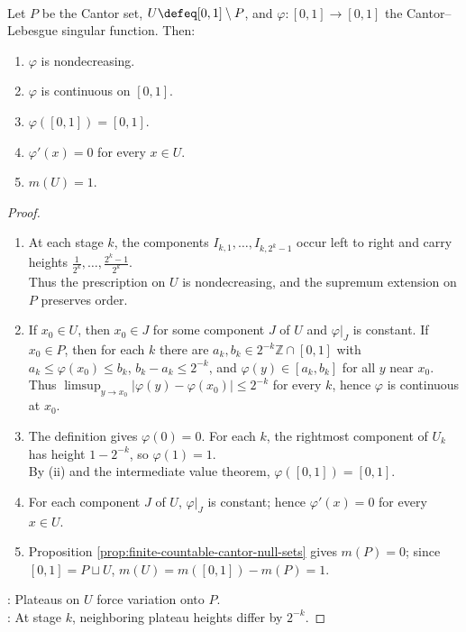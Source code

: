 \begin{proposition} \label{prop:cantor-singular-function-properties} \\
Let $P$ be the Cantor set, $U\defeq[0,1]\setminus P$, and $\varphi:[0,1]\to[0,1]$ the Cantor--Lebesgue singular function. Then:
\begin{enumerate}[label=(\roman*)]
\setlength{\itemsep}{0pt}
\item $\varphi$ is nondecreasing.
\item $\varphi$ is continuous on $[0,1]$.
\item $\varphi([0,1])=[0,1]$.
\item $\varphi'(x)=0$ for every $x\in U$.
\item $m(U)=1$.
\end{enumerate}
\begin{proof}
\begin{enumerate}[label=(\roman*)]
\setlength{\itemsep}{0pt}
\item At each stage $k$, the components $I_{k,1},\ldots,I_{k,2^k-1}$ occur left to right and carry heights $\frac{1}{2^k},\ldots,\frac{2^k-1}{2^k}$.\\
Thus the prescription on $U$ is nondecreasing, and the supremum extension on $P$ preserves order.
\item If $x_0\in U$, then $x_0\in J$ for some component $J$ of $U$ and $\varphi|_J$ is constant. If $x_0\in P$, then for each $k$ there are $a_k,b_k\in2^{-k}\mathbb{Z}\cap[0,1]$ with $a_k\leq\varphi(x_0)\leq b_k$, $b_k-a_k\leq2^{-k}$, and $\varphi(y)\in[a_k,b_k]$ for all $y$ near $x_0$.\\
Thus $\limsup_{y\to x_0}|\varphi(y)-\varphi(x_0)|\leq2^{-k}$ for every $k$, hence $\varphi$ is continuous at $x_0$.
\item The definition gives $\varphi(0)=0$. For each $k$, the rightmost component of $U_k$ has height $1-2^{-k}$, so $\varphi(1)=1$.\\
By (ii) and the intermediate value theorem, $\varphi([0,1])=[0,1]$.
\item For each component $J$ of $U$, $\varphi|_J$ is constant; hence $\varphi'(x)=0$ for every $x\in U$.
\item Proposition \ref{prop:finite-countable-cantor-null-sets} gives $m(P)=0$; since $[0,1]=P\sqcup U$, $m(U)=m([0,1])-m(P)=1$.
\end{enumerate}
: Plateaus on $U$ force variation onto $P$.\\
: At stage $k$, neighboring plateau heights differ by $2^{-k}$.
\end{proof}
\end{proposition}

